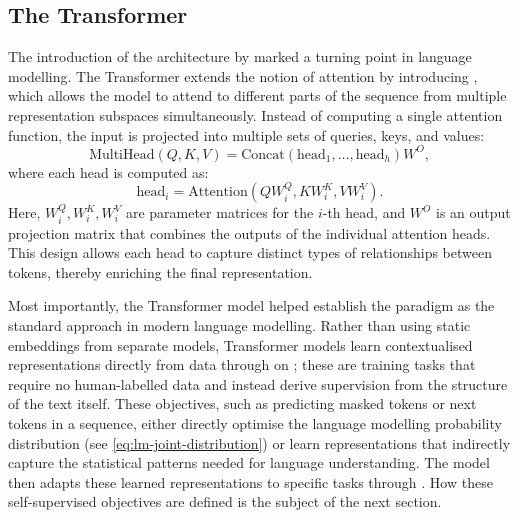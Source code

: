 \subsection{The Transformer}
The introduction of the  architecture by \citet{vaswani2017attention} marked a turning point in language modelling. The Transformer extends the notion of attention by introducing , which allows the model to attend to different parts of the sequence from multiple representation subspaces simultaneously. Instead of computing a single attention function, the input is projected into multiple sets of queries, keys, and values:
\begin{equation}
\text{MultiHead}(Q, K, V) = \text{Concat}(\text{head}_1, \dots, \text{head}_h)W^O,
\end{equation}
where each head is computed as:
\begin{equation}
\text{head}_i = \text{Attention}(QW_i^Q, KW_i^K, VW_i^V).
\end{equation}
Here, $W_i^Q, W_i^K, W_i^V$ are parameter matrices for the $i$-th head, and $W^O$ is an output projection matrix that combines the outputs of the individual attention heads. This design allows each head to capture distinct types of relationships between tokens, thereby enriching the final representation.

Most importantly, the Transformer model helped establish the  paradigm as the standard approach in modern language modelling. Rather than using static embeddings from separate models, Transformer models learn contextualised representations directly from data through  on ; these are training tasks that require no human-labelled data and instead derive supervision from the structure of the text itself. These objectives, such as predicting masked tokens or next tokens in a sequence, either directly optimise the language modelling probability distribution (see \cref{eq:lm-joint-distribution}) or learn representations that indirectly capture the statistical patterns needed for language understanding. The model then adapts these learned representations to specific tasks through . How these self-supervised objectives are defined is the subject of the next section.




